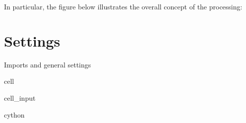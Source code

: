 \documentclass[letterpaper,10pt,english]{jupyterBook}
\begin{document}
\sphinxAtStartPar
In particular, the figure below illustrates the overall concept of the processing:



\section{Settings}
\label{\detokenize{CIMR_L2_Sea_Ice_Drift_algorithm:settings}}
\sphinxAtStartPar
Imports and general settings

\begin{sphinxuseclass}{cell}\begin{sphinxVerbatimInput}

\begin{sphinxuseclass}{cell_input}
\begin{sphinxVerbatim}[commandchars=\\\{\}]
 cython
\end{sphinxVerbatim}

\end{sphinxuseclass}\end{sphinxVerbatimInput}

\end{sphinxuseclass}
\end{document}
